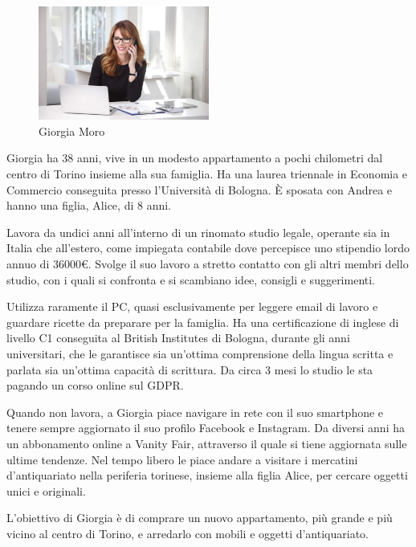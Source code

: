 \documentclass[12pt,italian,]{report}
\begin{document}
\begin{figure}[h]
\centering
\includegraphics[width=0.5\textwidth,height=\textheight]{img/giorgia.jpg}
\caption{Giorgia Moro}
\end{figure}

Giorgia ha 38 anni, vive in un modesto appartamento a pochi chilometri
dal centro di Torino insieme alla sua famiglia. Ha una laurea triennale
in Economia e Commercio conseguita presso l'Università di Bologna. È
sposata con Andrea e hanno una figlia, Alice, di 8 anni.

Lavora da undici anni all'interno di un rinomato studio legale, operante
sia in Italia che all'estero, come impiegata contabile dove percepisce
uno stipendio lordo annuo di 36000€. Svolge il suo lavoro a stretto
contatto con gli altri membri dello studio, con i quali si confronta e
si scambiano idee, consigli e suggerimenti.

Utilizza raramente il PC, quasi esclusivamente per leggere email di
lavoro e guardare ricette da preparare per la famiglia. Ha una
certificazione di inglese di livello C1 conseguita al British Institutes
di Bologna, durante gli anni universitari, che le garantisce sia
un'ottima comprensione della lingua scritta e parlata sia un'ottima
capacità di scrittura. Da circa 3 mesi lo studio le sta pagando un corso
online sul GDPR.

Quando non lavora, a Giorgia piace navigare in rete con il suo
smartphone e tenere sempre aggiornato il suo profilo Facebook e
Instagram. Da diversi anni ha un abbonamento online a Vanity Fair,
attraverso il quale si tiene aggiornata sulle ultime tendenze. Nel tempo
libero le piace andare a visitare i mercatini d'antiquariato nella
periferia torinese, insieme alla figlia Alice, per cercare oggetti unici
e originali.

L'obiettivo di Giorgia è di comprare un nuovo appartamento, più grande e
più vicino al centro di Torino, e arredarlo con mobili e oggetti
d'antiquariato.
\end{document}
